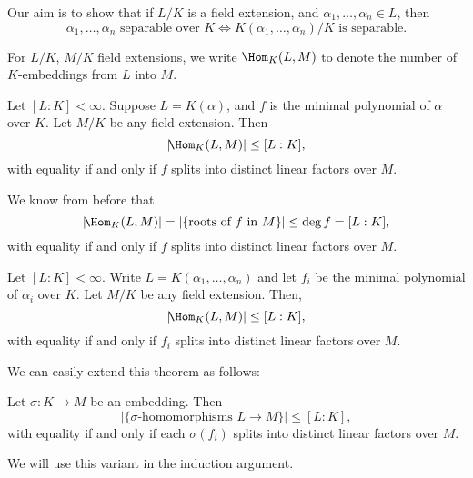 \documentclass[12pt]{article}
\begin{document}
Our aim is to show that if $L/K$ is a field extension, and $\alpha_1, \ldots, \alpha_n \in L$, then
\[
	\alpha_1, \ldots, \alpha_n \text{ separable over } K \iff K(\alpha_1, \ldots, \alpha_n) / K \text{ is separable}.
\]

For $L/K$, $M/K$ field extensions, we write $\Hom_K(L,M)$ to denote the number of $K$-embeddings from $L$ into $M$.

\begin{lemma}
	Let $[L:K] < \infty$. Suppose $L = K(\alpha)$, and $f$ is the minimal polynomial of $\alpha$ over $K$. Let $M/K$ be any field extension. Then
	\[
		|\!\Hom_K(L,M)| \leq [L:K],
	\]
	with equality if and only if $f$ splits into distinct linear factors over $M$.
\end{lemma}

\begin{proofbox}
	We know from before that
	\[
		|\!\Hom_K(L,M)| = |\{\text{roots of } f \text{ in } M\}| \leq \deg f = [L:K],
	\]
	with equality if and only if $f$ splits into distinct linear factors over $M$.
\end{proofbox}

\begin{theorem}\label{thm:num_of_homs}
	Let $[L:K] < \infty$. Write $L = K(\alpha_1, \ldots, \alpha_n)$ and let $f_i$ be the minimal polynomial of $\alpha_i$ over $K$. Let $M/K$ be any field extension. Then,
	\[
		|\!\Hom_K(L,M)| \leq [L:K],
	\]
	with equality if and only if $f_i$ splits into distinct linear factors over $M$.
\end{theorem}

We can easily extend this theorem as follows:

\begin{theorem}
	Let $\sigma : K \to M$ be an embedding. Then
	\[
		|\{\sigma\text{-homomorphisms } L \to M\}| \leq [L:K],
	\]
	with equality if and only if each $\sigma(f_i)$ splits into distinct linear factors over $M$.
\end{theorem}

We will use this variant in the induction argument.
\end{document}
